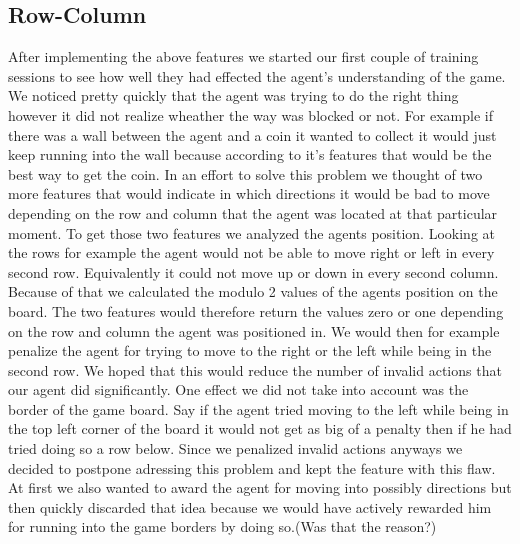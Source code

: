 \subsection{Row-Column}
After implementing the above features we started our first couple of training sessions to see how well they had effected the agent's understanding of the game. We noticed pretty quickly that the agent was trying to do the right thing however it did not realize wheather the way was blocked or not. For example if there was a wall between the agent and a coin it wanted to collect it would just keep running into the wall because according to it's features that would be the best way to get the coin. In an effort to solve this problem we thought of two more features that would indicate in which directions it would be bad to move depending on the row and column that the agent was located at that particular moment. To get those two features we analyzed the agents position. Looking at the rows for example the agent would not be able to move right or left in every second row. Equivalently it could not move up or down in every second column. Because of that we calculated the modulo 2 values of the agents position on the board. The two features would therefore return the values zero or one depending on the row and column the agent was positioned in. We would then for example penalize the agent for trying to move to the right or the left while being in the second row. We hoped that this would reduce the number of invalid actions that our agent did significantly. One effect we did not take into account was the border of the game board. Say if the agent tried moving to the left while being in the top left corner of the board it would not get as big of a penalty then if he had tried doing so a row below. Since we penalized invalid actions anyways we decided to postpone adressing this problem and kept the feature with this flaw. At first we also wanted to award the agent for moving into possibly directions but then quickly discarded that idea because we would have actively rewarded him for running into the game borders by doing so.(Was that the reason?) 




